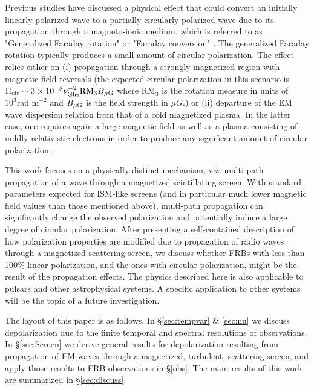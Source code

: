 \documentclass[fleqn,usenatbib]{mnras}
\begin{document}
	Previous studies have discussed a physical effect that could convert an initially linearly polarized wave to a partially circularly polarized wave due to its propagation through a magneto-ionic medium, which is referred to as "Generalized Faraday rotation" or "Faraday conversion" \citep{Cohen1960,ZZ1964,KM1998,VR2019,GL2019}. The generalized Faraday rotation typically produces a small amount of circular polarization. The effect relies either on (i) 
	propagation through a strongly magnetized region with magnetic field reversals (the expected circular polarization in this scenario is $\Pi_{\rm cir}\sim 3\times10^{-8}\nu_{\rm Ghz}^{-2}\mbox{RM}_3B_{\rm \mu G}$ where RM$_3$ is the rotation measure in units of $10^3\mbox{rad m}^{-2}$ and $B_{\rm \mu G}$ is the field strength in $\mu G$.) or (ii) departure of the EM wave dispersion relation from that of a cold magnetized plasma. In the latter case, one requires again a large magnetic field as well as a plasma consisting of mildly relativistic electrons in order to produce any significant amount of circular polarization.
	
	
	This work focuses on a physically distinct mechanism, viz. multi-path propagation of a wave through a magnetized scintillating screen. With standard parameters expected for ISM-like screens (and in particular much lower magnetic field values than those mentioned above), multi-path propagation can significantly change the observed polarization and potentially induce a large degree of circular polarization. After presenting a self-contained description of how polarization properties are modified due to propagation of radio waves through a magnetized scattering screen, we discuss whether FRBs with less than 100\% linear polarization, and the ones with circular polarization, might be the result of the propagation effects. The physics described here is also applicable to pulsars and other astrophysical systems. A specific application to other systems will be the topic of a future investigation.
	
	
	The layout of this paper is as follows. In \S \ref{sec:tempvar} \& \ref{sec:nu} we discuss depolarization due to the finite temporal and spectral resolutions of observations. In \S \ref{sec:Screen} we derive general results for depolarization resulting from propagation of EM waves through a magnetized, turbulent, scattering screen, and apply those results to FRB observations in \S \ref{obs}. The main results of this work are summarized in \S \ref{sec:discuss}.
	
\end{document}
